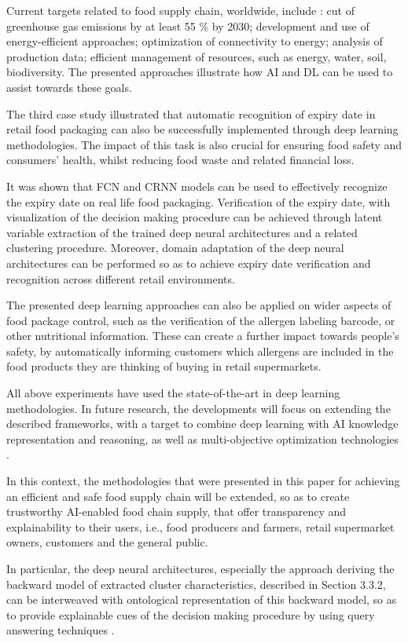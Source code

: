 \documentclass[journal,article,accept,moreauthors,pdftex]{Definitions/mdpi}
\begin{document}
Current targets related to food supply chain, worldwide, include \cite{ref62}: cut of greenhouse gas emissions by at least 55 \% by 2030; development and use of energy-efficient approaches; optimization of connectivity to energy; analysis of production data; efficient management of resources, such as energy, water, soil,  biodiversity. The presented approaches illustrate how AI and DL can be used to assist towards these goals.

The third case study illustrated that automatic recognition of expiry date in retail food packaging
can also be successfully implemented through deep learning methodologies. The impact of this task is also crucial for ensuring food safety and consumers' health, whilst reducing food waste and related financial loss. 

It was shown that FCN and CRNN models can be used to effectively recognize the expiry date on real life food packaging. Verification of the expiry date, with visualization of the decision making procedure can be achieved through latent variable extraction of the trained deep neural architectures and a related clustering procedure. Moreover, domain adaptation of the deep neural architectures can be performed so as to achieve expiry date verification and recognition across different retail environments.  

The presented deep learning approaches can
also be applied on wider aspects of food package control,
such as the verification of the allergen labeling barcode, or other
nutritional information. These can create a further impact towards people's safety, by automatically informing customers which allergens are included in the food products they are thinking of buying in retail supermarkets.   

All above experiments have used the state-of-the-art in deep learning methodologies. In future research, the developments will focus on extending the described frameworks, with a target to  combine deep learning with AI knowledge representation and reasoning, as well as multi-objective optimization technologies \cite{ref63, ref64}.  

In this context, the methodologies that were presented in this paper for achieving an efficient and safe food supply chain will be extended, so as to create trustworthy AI-enabled food chain supply, that offer transparency and explainability to their users, i.e., food producers and farmers, retail supermarket owners, customers and the general public.

In particular, the deep neural architectures, especially the approach deriving the backward model of extracted cluster characteristics, described in Section 3.3.2, can be interweaved with ontological representation \cite{ref97} of this backward model, so as to provide explainable cues of the decision making procedure by using query answering techniques \cite{ref65, ref66}. 
\end{document}
